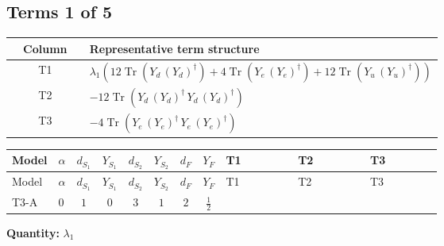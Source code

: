 \documentclass[8pt]{article}
\begin{document}
\begin{landscape}
\subsection*{Terms 1 of 5}
\begin{center}
\begin{tabular}{@{}c >{\raggedright\arraybackslash}p{0.82\linewidth}@{}}
\toprule
Column & Representative term structure \\
\midrule
T1 & \(\displaystyle {\lambda_1} (12 \operatorname{Tr}\!\left({Y_d}\,\left({Y_d}\right)^{\dagger}\right)+4 \operatorname{Tr}\!\left({Y_e}\,\left({Y_e}\right)^{\dagger}\right)+12 \operatorname{Tr}\!\left({Y_u}\,\left({Y_u}\right)^{\dagger}\right))\) \\
\midrule
T2 & \(\displaystyle -12 \operatorname{Tr}\!\left({Y_d}\,\left({Y_d}\right)^{\dagger}\,{Y_d}\,\left({Y_d}\right)^{\dagger}\right)\) \\
\midrule
T3 & \(\displaystyle -4 \operatorname{Tr}\!\left({Y_e}\,\left({Y_e}\right)^{\dagger}\,{Y_e}\,\left({Y_e}\right)^{\dagger}\right)\) \\
\midrule
\bottomrule
\end{tabular}
\end{center}
\smallskip
\tiny
\begin{longtable}{@{}llcccccc >{\raggedright\arraybackslash}p{0.21\linewidth} >{\raggedright\arraybackslash}p{0.21\linewidth} >{\raggedright\arraybackslash}p{0.21\linewidth}@{}}
\toprule
Model & $\alpha$ & $d_{S_1}$ & $Y_{S_1}$ & $d_{S_2}$ & $Y_{S_2}$ & $d_F$ & $Y_F$ & T1 & T2 & T3 \\
\midrule
\endfirsthead
\toprule
Model & $\alpha$ & $d_{S_1}$ & $Y_{S_1}$ & $d_{S_2}$ & $Y_{S_2}$ & $d_F$ & $Y_F$ & T1 & T2 & T3 \\
\midrule
\endhead
T3-A & $0$ & $1$ & $0$ & $3$ & $1$ & $2$ & $\frac{1}{2}$ & \scriptsize\adjustbox{max width=\linewidth}{$\begin{gathered} {\lambda_1} (12 \operatorname{Tr}\!\left({Y_d}\,\left({Y_d}\right)^{\dagger}\right)+4 \operatorname{Tr}\!\left({Y_e}\,\left({Y_e}\right)^{\dagger}\right)+12 \operatorname{Tr}\!\left({Y_u}\,\left({Y_u}\right)^{\dagger}\right))\end{gathered}$} & \scriptsize\adjustbox{max width=\linewidth}{$\begin{gathered} -12 \operatorname{Tr}\!\left({Y_d}\,\left({Y_d}\right)^{\dagger}\,{Y_d}\,\left({Y_d}\right)^{\dagger}\right)\end{gathered}$} & \scriptsize\adjustbox{max width=\linewidth}{$\begin{gathered} -4 \operatorname{Tr}\!\left({Y_e}\,\left({Y_e}\right)^{\dagger}\,{Y_e}\,\left({Y_e}\right)^{\dagger}\right)\end{gathered}$} \\
\midrule
\bottomrule
\end{longtable}
\clearpage
\noindent\textbf{Quantity: }$\lambda_1$\par\smallskip

\end{landscape}
\end{document}
